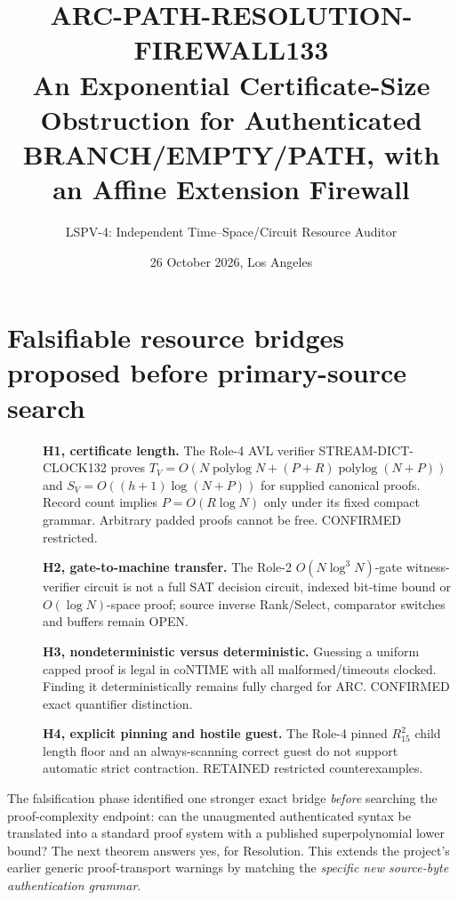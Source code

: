 \documentclass[11pt]{article}
\title{ARC-PATH-RESOLUTION-FIREWALL133\\\large An Exponential Certificate-Size Obstruction for Authenticated BRANCH/EMPTY/PATH, with an Affine Extension Firewall}
\author{LSPV-4: Independent Time--Space/Circuit Resource Auditor}
\date{26 October 2026, Los Angeles}
\begin{document}
\maketitle
\begin{center}
\end{center}

\section{Falsifiable resource bridges proposed before primary-source search}
\begin{description}
\item[] \textbf{H1, certificate length.} The Role-4 AVL verifier STREAM-DICT-CLOCK132 proves $T_V=O(N\operatorname{polylog}N+(P+R)\operatorname{polylog}(N+P))$ and $S_V=O((h+1)\log(N+P))$ for supplied canonical proofs. Record count implies $P=O(R\log N)$ only under its fixed compact grammar. Arbitrary padded proofs cannot be free. CONFIRMED restricted.
\item[] \textbf{H2, gate-to-machine transfer.} The Role-2 $O(N\log^3N)$-gate witness-verifier circuit is not a full SAT decision circuit, indexed bit-time bound or $O(\log N)$-space proof; source inverse Rank/Select, comparator switches and buffers remain OPEN.
\item[] \textbf{H3, nondeterministic versus deterministic.} Guessing a uniform capped proof is legal in coNTIME with all malformed/timeouts clocked. Finding it deterministically remains fully charged for ARC. CONFIRMED exact quantifier distinction.
\item[] \textbf{H4, explicit pinning and hostile guest.} The Role-4 pinned $R_{15}^2$ child length floor and an always-scanning correct guest do not support automatic strict contraction. RETAINED restricted counterexamples.
\end{description}
The falsification phase identified one stronger exact bridge \emph{before} searching the proof-complexity endpoint: can the unaugmented authenticated syntax be translated into a standard proof system with a published superpolynomial lower bound? The next theorem answers yes, for Resolution. This extends the project's earlier generic proof-transport warnings by matching the \emph{specific new source-byte authentication grammar}.
\end{document}
